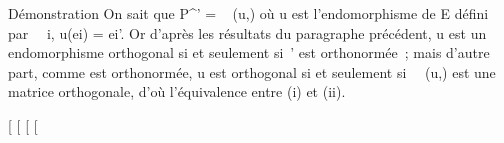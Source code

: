 Démonstration On sait que P^'
= \mathrmMat~ (u,) où u est
l'endomorphisme de E défini par \forall~~i,
u(ei) = ei'. Or d'après les résultats du paragraphe
précédent, u est un endomorphisme orthogonal si et seulement si~' est
orthonormée~; mais d'autre part, comme  est orthonormée, u est
orthogonal si et seulement
si~\mathrmMat~ (u,) est une
matrice orthogonale, d'où l'équivalence entre (i) et (ii).

{[}
{[}
{[}
{[}
